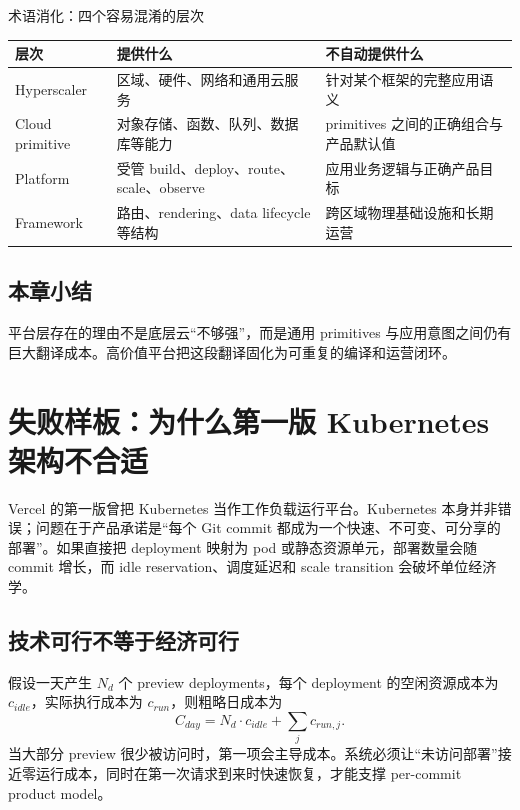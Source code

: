\documentclass[a4paper]{article}
\begin{document}
\begin{knowledgebox}{术语消化：四个容易混淆的层次}
\begin{tabularx}{\textwidth}{L{0.20\textwidth}>{\raggedright\arraybackslash}X>{\raggedright\arraybackslash}X}
\toprule
层次 & 提供什么 & 不自动提供什么 \\
\midrule
Hyperscaler & 区域、硬件、网络和通用云服务 & 针对某个框架的完整应用语义 \\
Cloud primitive & 对象存储、函数、队列、数据库等能力 & primitives 之间的正确组合与产品默认值 \\
Platform & 受管 build、deploy、route、scale、observe & 应用业务逻辑与正确产品目标 \\
Framework & 路由、rendering、data lifecycle 等结构 & 跨区域物理基础设施和长期运营 \\
\bottomrule
\end{tabularx}
\end{knowledgebox}

\subsection{本章小结}

平台层存在的理由不是底层云“不够强”，而是通用 primitives 与应用意图之间仍有巨大翻译成本。高价值平台把这段翻译固化为可重复的编译和运营闭环。

\section{失败样板：为什么第一版 Kubernetes 架构不合适}

Vercel 的第一版曾把 Kubernetes 当作工作负载运行平台。Kubernetes 本身并非错误；问题在于产品承诺是“每个 Git commit 都成为一个快速、不可变、可分享的部署”。如果直接把 deployment 映射为 pod 或静态资源单元，部署数量会随 commit 增长，而 idle reservation、调度延迟和 scale transition 会破坏单位经济学。

\subsection{技术可行不等于经济可行}

假设一天产生 $N_d$ 个 preview deployments，每个 deployment 的空闲资源成本为 $c_{idle}$，实际执行成本为 $c_{run}$，则粗略日成本为
\[
C_{day}=N_d\cdot c_{idle}+\sum_j c_{run,j}.
\]
当大部分 preview 很少被访问时，第一项会主导成本。系统必须让“未访问部署”接近零运行成本，同时在第一次请求到来时快速恢复，才能支撑 per-commit product model。
\end{document}
